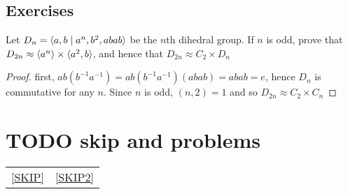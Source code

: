 \documentclass[11pt]{article}
\begin{document}
\label{SKIP2}
\subsection{Exercises}
\label{sec:org1a1b08b}
\begin{exercise}
\label{ex2.1}
Let \(D_n=\langle a,b\mid a^n,b^2,abab\rangle\) be the \(n\)th dihedral group. If \(n\) is odd, prove
that \(D_{2n}\approx\langle a^n\rangle\times\langle a^2,b\rangle\), and hence that \(D_{2n}\approx C_2\times D_n\)
\end{exercise}

\begin{proof}
first, \(ab(b^{-1}a^{-1})=ab(b^{-1}a^{-1})(abab)=abab=e\), hence \(D_n\) is commutative for
any \(n\). Since \(n\) is odd, \((n,2)=1\) and so \(D_{2n}\approx C_2\times C_{n}\)
\end{proof}
\section{{\bfseries\sffamily TODO} skip and problems}
\label{sec:org41640c3}
\begin{center}
\begin{tabular}{ll}
\ref{SKIP} & \ref{SKIP2}\\
\end{tabular}
\end{center}
\end{document}
